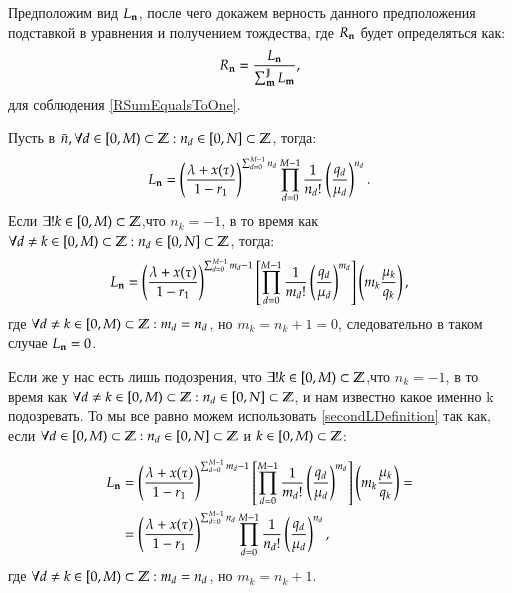 Предположим вид \(\Ln\), после чего докажем верность 
данного предположения подставкой в уравнения и получением тождества, 
где \(\Rn\) будет определяться как:
\[\Rn = \frac{\Ln}{\sum_{\bold{m}}^{\Jt}\Lm},\]
для соблюдения \eqref{RSumEqualsToOne}.

Пусть в \(\bar{n}, \forall d \in \Mt: n_d \in \Nt \), тогда:
\begin{equation} \label{firstLDefinition}
    \Ln = \Ldefinition{n}{d}.
\end{equation}
Если \(\exists! k \in \Mt \),что \(n_k=-1\), в то время как 
    \(\forall d \neq k \in \Mt: n_d \in \Nt\), тогда:
\begin{equation} \label{secondLDefinition}
    \Ln = \LminusDefinition{m}{d}{k},
\end{equation}
где \(\forall d \neq k \in \Mt: m_d = n_d\), но \(m_k = n_k + 1 = 0\),
следовательно в таком случае \(\Ln = 0\).

Если же у нас есть лишь подозрения, что 
\(\exists! k \in \Mt \),что \(n_k=-1\), в то время как 
\(\forall d \neq k \in \Mt: n_d \in \Nt\), 
и нам известно какое именно k подозревать.
То мы все равно можем использовать \eqref{secondLDefinition} так как, 
если \(\forall d \in \Mt: n_d \in \Nt\) и \(k \in \Mt\):

\begin{equation}\begin{aligned}
    \Ln &= \LminusDefinition{m}{d}{k} = \\
        &= \Ldefinition{n}{d},
\end{aligned}\end{equation}
где \(\forall d \neq k \in \Mt: m_d = n_d\), но \(m_k = n_k + 1\).
 
